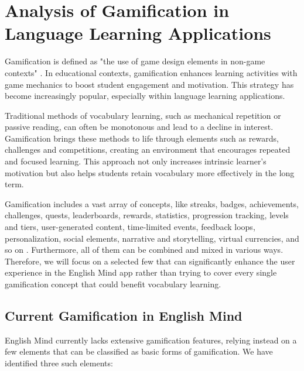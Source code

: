 \chapter{Analysis of Gamification in Language Learning Applications}

Gamification is defined as "the use of game design elements in non-game contexts" \cite{cite:deterding2011_gamefulness}. In educational contexts, gamification enhances learning activities with game mechanics to boost student engagement and motivation. This strategy has become increasingly popular, especially within language learning applications.

Traditional methods of vocabulary learning, such as mechanical repetition or passive reading, can often be monotonous and lead to a decline in interest. Gamification brings these methods to life through elements such as rewards, challenges and competitions, creating an environment that encourages repeated and focused learning. This approach not only increases intrinsic learner's motivation but also helps students retain vocabulary more effectively in the long term.

Gamification includes a vast array of concepts, like streaks, badges, achievements, challenges, quests, leaderboards, rewards, statistics, progression tracking, levels and tiers, user-generated content, time-limited events, feedback loops, personalization, social elements, narrative and storytelling, virtual currencies, and so on \cite{cite:govender2021_gamification_elements_in_language_learning_apps}. Furthermore, all of them can be combined and mixed in various ways. Therefore, we will focus on a selected few that can significantly enhance the user experience in the English Mind app rather than trying to cover every single gamification concept that could benefit vocabulary learning.

\newpage

\section{Current Gamification in English Mind}

English Mind currently lacks extensive gamification features, relying instead on a few elements that can be classified as basic forms of gamification. We have identified three such elements:

